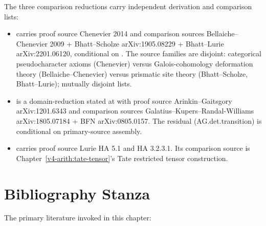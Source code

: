 \begin{remark}
\label{v4-arith:w5-h:rem:wave5-hziv-data}
The three comparison reductions carry independent derivation and
comparison lists:
\begin{itemize}
\item {} carries proof source Chenevier 2014 and comparison sources Bellaiche--Chenevier
2009 + Bhatt--Scholze arXiv:1905.08229 + Bhatt--Lurie
arXiv:2201.06120, conditional on
.
The source families are disjoint: categorical pseudocharacter
axioms (Chenevier) versus Galois-cohomology deformation theory
(Bellaiche--Chenevier) versus prismatic site theory
(Bhatt--Scholze, Bhatt--Lurie); mutually disjoint lists.
\item {} is a domain-reduction
stated at \ClaimStatusProvedHere with proof source
Arinkin--Gaitsgory arXiv:1201.6343 and comparison sources
Galatius--Kupers--Randal-Williams arXiv:1805.07184 + BFN
arXiv:0805.0157. The residual (AG.det.transition) is
\ClaimStatusConjectured conditional on primary-source assembly.
\item {} carries proof source
Lurie HA 5.1 and HA 3.2.3.1. Its comparison source is
Chapter~\ref{v4-arith:tate-tensor}'s Tate restricted tensor
construction.
\end{itemize}
\end{remark}

\section{Bibliography Stanza}
\label{v4-arith:w5-h:bibliography}

The primary literature invoked in this chapter:


